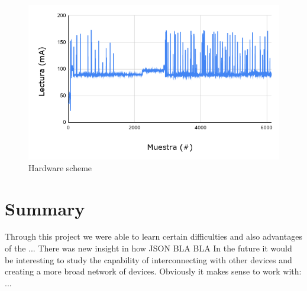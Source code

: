 \documentclass{article}
\begin{document}
\begin{figure}[]
	\centering
	\includegraphics[scale=0.5]{images/chart.png}
	\caption{Hardware scheme}	
	\label{chart_power}
\end{figure}

\newpage

\section{Summary}
Through this project we were able to learn certain difficulties and also advantages of the ... 
There was new insight in how JSON BLA BLA 
In the future it would be interesting to study the capability of interconnecting with other devices and creating a more broad network of devices. Obviously it makes sense to work with: ...
\end{document}
